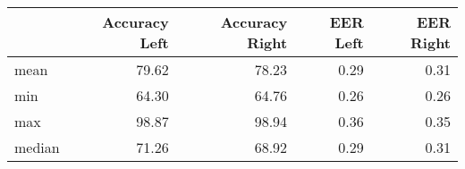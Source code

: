 \begin{tabular}{lrrrr}
\toprule
{} &  Accuracy Left &  Accuracy Right &  EER Left &  EER Right \\
\midrule
mean   &          79.62 &           78.23 &      0.29 &       0.31 \\
min    &          64.30 &           64.76 &      0.26 &       0.26 \\
max    &          98.87 &           98.94 &      0.36 &       0.35 \\
median &          71.26 &           68.92 &      0.29 &       0.31 \\
\bottomrule
\end{tabular}
